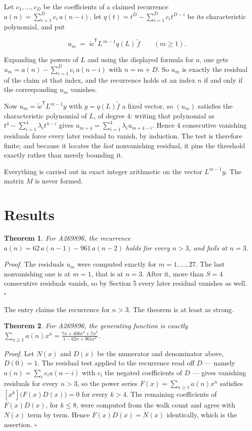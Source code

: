 \documentclass[11pt]{article}
\newtheorem{theorem}{Theorem}
\theoremstyle{definition}
\begin{document}
Let $c_1,\dots,c_D$ be the coefficients of a claimed recurrence $a(n) = \sum_{i=1}^{D} c_i\,a(n-i)$, let $q(t) = t^{D} - \sum_{i=1}^{D} c_i t^{D-i}$ be its characteristic polynomial, and put

\[u_m \;=\; \tilde w^{\mathsf T} L^{\,m-1} q(L)\,\tilde f \qquad (m \ge 1).\]

Expanding the powers of $L$ and using the displayed formula for $a$, one gets $u_m = a(n) - \sum_{i=1}^{D} c_i\,a(n-i)$ with $n = m + D$. So $u_m$ is exactly the residual of the claim at that index, and the recurrence holds at an index $n$ if and only if the corresponding $u_m$ vanishes.

Now $u_m = \tilde w^{\mathsf T} L^{m-1} y$ with $y = q(L)\tilde f$ a fixed vector, so $(u_m)$ satisfies the characteristic polynomial of $L$, of degree $4$: writing that polynomial as $t^{4} - \sum_{i=1}^{4} \lambda_i t^{4-i}$ gives $u_{m+4} = \sum_{i=1}^{4} \lambda_i u_{m+4-i}$. Hence $4$ consecutive vanishing residuals force every later residual to vanish, by induction. The test is therefore finite; and because it locates the {\itshape last} nonvanishing residual, it pins the threshold exactly rather than merely bounding it.

Everything is carried out in exact integer arithmetic on the vector $L^{m-1}y$. The matrix $M$ is never formed.

\section{Results}

\begin{theorem} For A269896, the recurrence $a(n) = 62\,a(n-1) - 961\,a(n-2)$ holds for every $n > 3$, and fails at $n = 3$.\end{theorem}

{\itshape Proof.} The residuals $u_m$ were computed exactly for $m = 1,\dots,27$. The last nonvanishing one is at $m = 1$, that is at $n = 3$. After it, more than $S = 4$ consecutive residuals vanish, so by Section 5 every later residual vanishes as well. $\square$

The entry claims the recurrence for $n > 3$. The theorem is at least as strong.

\begin{theorem} For A269896, the generating function is exactly $\sum_{n\ge 1} a(n)x^n = \frac{7x + 406x^{2} + 7x^{3}}{1 - 62x + 961x^{2}}$.\end{theorem}

{\itshape Proof.} Let $N(x)$ and $D(x)$ be the numerator and denominator above, $D(0)=1$. The residual test applied to the recurrence read off $D$ --- namely $a(n) = \sum_i c_i a(n-i)$ with $c_i$ the negated coefficients of $D$ --- gives vanishing residuals for every $n > 3$, so the power series $F(x)=\sum_{n\ge 1}a(n)x^n$ satisfies $[x^k]\bigl(F(x)D(x)\bigr) = 0$ for every $k > 4$. The remaining coefficients of $F(x)D(x)$, for $k \le 8$, were computed from the walk count and agree with $N(x)$ term by term. Hence $F(x)D(x) = N(x)$ identically, which is the assertion. $\square$
\end{document}
